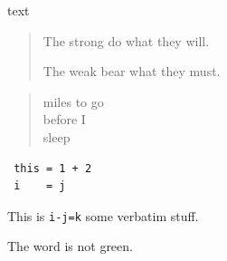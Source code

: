 \documentclass{book}
\begin{document}
text\par

\begin{quotation}
The strong do what they
    will.

The weak bear what they
              must.
\end{quotation}

\begin{verse}
miles to
      go\\
before I\\
       sleep
\end{verse}

\begin{verbatim}
 this = 1 + 2
 i    = j
\end{verbatim}

This is \verb+i-j=k+ some verbatim stuff.

The word is \color{red} not green.
\end{document}
